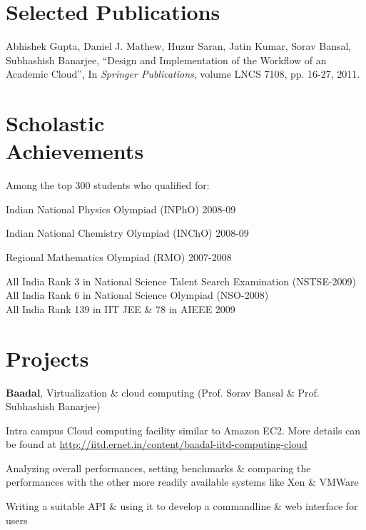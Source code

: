 \documentclass[margin,line]{resume}
\begin{document}
\begin{resume}
    \section{\mysidestyle Selected Publications}
    Abhishek Gupta, Daniel J. Mathew, Huzur Saran, Jatin Kumar, Sorav Bansal, Subhashish Banarjee, ``Design and Implementation of the Workflow of an Academic Cloud'',
    In \textsl{Springer Publications}, volume LNCS 7108, pp. 16-27, 2011.\vspace{-1.5mm}

    \section{\mysidestyle Scholastic\\Achievements} 
    Among the top 300 students who qualified for:
    \begin{list2}
    \item Indian National Physics Olympiad (INPhO) 2008-09
    \item Indian National Chemistry Olympiad (INChO) 2008-09
    \item Regional Mathematics Olympiad (RMO) 2007-2008
    \end{list2}\vspace{-1.5mm}
    All India Rank 3 in National Science Talent Search Examination (NSTSE-2009)\vspace{1mm}\\%
    All India Rank 6 in National Science Olympiad (NSO-2008)\vspace{1mm}\\%
    All India Rank 139 in IIT JEE \& 78 in AIEEE 2009\vspace{-1.5mm}

    \section{\mysidestyle Projects}
    \textbf{Baadal}, Virtualization \& cloud computing \hfill(Prof. Sorav Bansal \& Prof. Subhashish Banarjee)
    \begin{list2}
        \item Intra campus Cloud computing facility similar to Amazon EC2. More details can be found at \url{http://iitd.ernet.in/content/baadal-iitd-computing-cloud}
        \item Analyzing overall performances, setting benchmarks \& comparing the performances with the other more readily available systems like Xen \& VMWare
        \item Writing a suitable API \& using it to develop a commandline \& web interface for users
    \end{list2}


\end{resume}
\end{document}
